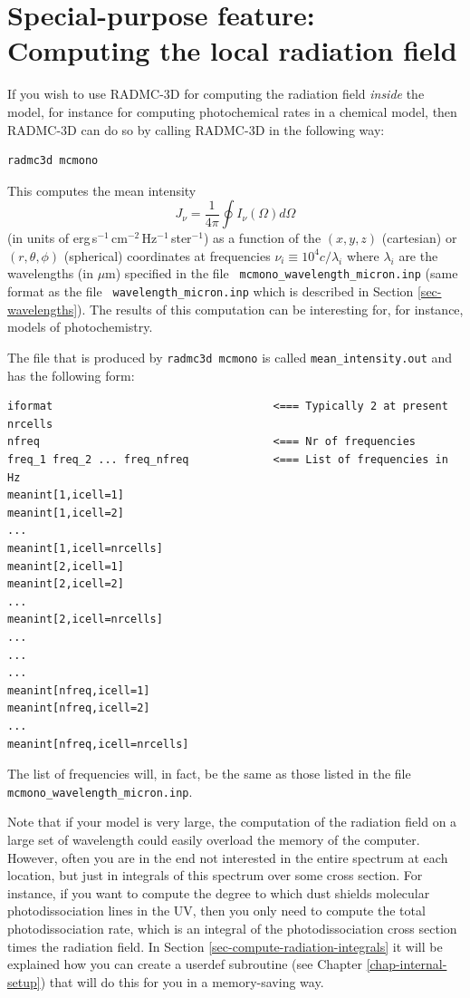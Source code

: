 \documentclass{report}
\newenvironment{asciibox}%
  {\begin{list}{}{%
    \setlength{\topsep}{0.5em}%
    \setlength{\parskip}{0em}%
    \setlength{\parsep}{0em}%
    \setlength{\itemsep}{0em}%
    \setlength{\rightmargin}{0em}%
    \setlength{\leftmargin}{3.0em}%
    \setlength{\labelsep}{1em}%
    \setlength{\labelwidth}{2em}%
  }\normalfont\footnotesize\item}
  {\end{list}}
\begin{document}
\section{Special-purpose feature: Computing the local radiation field}
\label{sec-dust-monochromatic-monte-carlo}
%
If you wish to use RADMC-3D for computing the radiation field {\em inside}
the model, for instance for computing photochemical rates in a chemical model,
then RADMC-3D can do so by calling RADMC-3D in the following way:
{\small\begin{verbatim}
radmc3d mcmono
\end{verbatim}}
This computes the mean intensity 
\begin{equation}
  J_\nu = \frac{1}{4\pi}\oint I_\nu(\Omega)d\Omega
\end{equation}
(in units of erg$\,$s$^{-1}$$\,$cm$^{-2}$$\,$Hz$^{-1}$$\,$ster$^{-1}$) as a
function of the $(x,y,z)$ (cartesian) or $(r,\theta,\phi)$ (spherical)
coordinates at frequencies $\nu_i\equiv 10^4c/\lambda_i$ where $\lambda_i$
are the wavelengths (in $\mu$m) specified in the file {\small\tt
  mcmono\_wavelength\_micron.inp} (same format as the file {\small\tt
  wavelength\_micron.inp} which is described in Section
\ref{sec-wavelengths}). The results of this computation can be interesting
for, for instance, models of photochemistry.

The file that is produced by {\small\tt radmc3d mcmono} is called
{\small\tt mean\_intensity.out} and has the following form:
\begin{asciibox}\begin{verbatim}
iformat                                  <=== Typically 2 at present
nrcells
nfreq                                    <=== Nr of frequencies 
freq_1 freq_2 ... freq_nfreq             <=== List of frequencies in Hz
meanint[1,icell=1]
meanint[1,icell=2]
...
meanint[1,icell=nrcells]
meanint[2,icell=1]
meanint[2,icell=2]
...
meanint[2,icell=nrcells]
...
...
...
meanint[nfreq,icell=1]
meanint[nfreq,icell=2]
...
meanint[nfreq,icell=nrcells]
\end{verbatim}\end{asciibox}
The list of frequencies will, in fact, be the same as those listed in the
file {\small\tt mcmono\_wavelength\_micron.inp}.

Note that if your model is very large, the computation of the radiation
field on a large set of wavelength could easily overload the memory of the
computer. However, often you are in the end not interested in the entire
spectrum at each location, but just in integrals of this spectrum over some
cross section. For instance, if you want to compute the degree to which dust
shields molecular photodissociation lines in the UV, then you only need to
compute the total photodissociation rate, which is an integral of the
photodissociation cross section times the radiation field. In Section
\ref{sec-compute-radiation-integrals} it will be explained how you can
create a userdef subroutine (see Chapter \ref{chap-internal-setup}) that
will do this for you in a memory-saving way.
\end{document}
